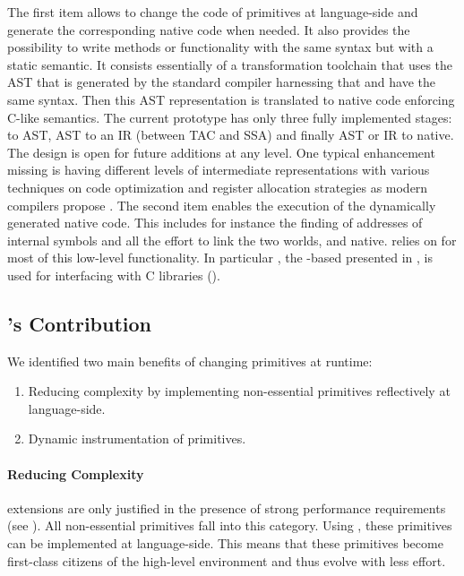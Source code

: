 \noindent The first item allows to change the code of primitives at language-side and generate the corresponding native code when needed. 
It also provides the possibility to write methods or functionality with the same \ST syntax but with a static semantic. 
It consists essentially of a transformation toolchain that uses the AST that is generated by the standard \PH compiler harnessing that \Slang and \ST have the same syntax. 
Then this AST representation is translated to native code enforcing C-like \Slang semantics. The current prototype has only three fully implemented stages: \Slang to AST, AST to an IR (between TAC and SSA) and finally AST or IR to native.
The design is open for future additions at any level.
One typical enhancement missing is having different levels of intermediate representations with various techniques on code optimization and register allocation strategies as modern compilers propose \cite[Ch.\ 1]{Appe98a}. 
The second item enables the execution of the dynamically generated native code.
This includes for instance the finding of addresses of \VM internal symbols and all the effort to link the two worlds, \ST and native.
\WF relies on \B for most of this low-level functionality.
In particular \NB, the \B-based \FFI presented in , is used for interfacing with C libraries (). 

\subsection{\WF's Contribution}
We identified two main benefits of changing \VM primitives at runtime:

\begin{enumerate}
	\item Reducing \VM complexity by implementing non-essential primitives reflectively at language-side.
	\item Dynamic instrumentation of primitives.
\end{enumerate}

\paragraph{Reducing \VM Complexity}
\VM extensions are only justified in the presence of strong performance requirements (see ).
All non-essential primitives fall into this category.
Using \WF, these primitives can be implemented at language-side.
This means that these primitives become first-class citizens of the high-level environment and thus evolve with less effort.

